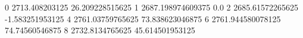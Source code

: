 0 2713.408203125 26.209228515625
1 2687.198974609375 0.0
2 2685.61572265625 -1.583251953125
4 2761.03759765625 73.838623046875
6 2761.944580078125 74.74560546875
8 2732.8134765625 45.614501953125
